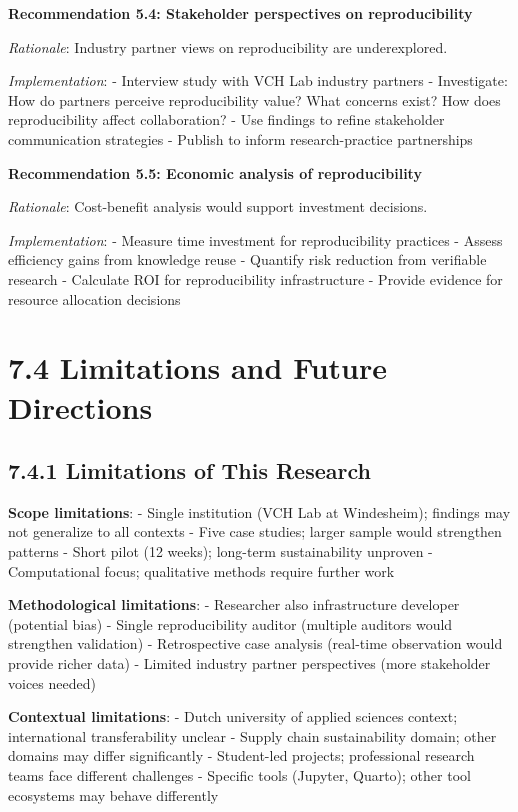 \documentclass[
  oneside,
  open=any]{scrbook}
\begin{document}
\textbf{Recommendation 5.4: Stakeholder perspectives on reproducibility}

\emph{Rationale}: Industry partner views on reproducibility are
underexplored.

\emph{Implementation}: - Interview study with VCH Lab industry partners
- Investigate: How do partners perceive reproducibility value? What
concerns exist? How does reproducibility affect collaboration? - Use
findings to refine stakeholder communication strategies - Publish to
inform research-practice partnerships

\textbf{Recommendation 5.5: Economic analysis of reproducibility}

\emph{Rationale}: Cost-benefit analysis would support investment
decisions.

\emph{Implementation}: - Measure time investment for reproducibility
practices - Assess efficiency gains from knowledge reuse - Quantify risk
reduction from verifiable research - Calculate ROI for reproducibility
infrastructure - Provide evidence for resource allocation decisions

\section{7.4 Limitations and Future
Directions}\label{limitations-and-future-directions}

\subsection{7.4.1 Limitations of This
Research}\label{limitations-of-this-research}

\textbf{Scope limitations}: - Single institution (VCH Lab at
Windesheim); findings may not generalize to all contexts - Five case
studies; larger sample would strengthen patterns - Short pilot (12
weeks); long-term sustainability unproven - Computational focus;
qualitative methods require further work

\textbf{Methodological limitations}: - Researcher also infrastructure
developer (potential bias) - Single reproducibility auditor (multiple
auditors would strengthen validation) - Retrospective case analysis
(real-time observation would provide richer data) - Limited industry
partner perspectives (more stakeholder voices needed)

\textbf{Contextual limitations}: - Dutch university of applied sciences
context; international transferability unclear - Supply chain
sustainability domain; other domains may differ significantly -
Student-led projects; professional research teams face different
challenges - Specific tools (Jupyter, Quarto); other tool ecosystems may
behave differently
\end{document}
